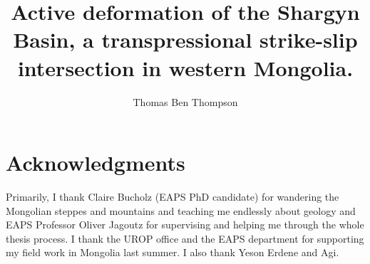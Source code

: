 \documentclass[12pt, doublepage, vi]{mitthesis}
\begin{document}
\title{Active deformation of the Shargyn Basin, a transpressional strike-slip intersection in western Mongolia.}
\author{Thomas Ben Thompson}
\maketitle


\section*{Acknowledgments}
Primarily, I thank Claire Bucholz (EAPS PhD candidate) for wandering the Mongolian steppes and mountains and teaching me endlessly about geology and EAPS Professor Oliver Jagoutz for supervising and helping me through the whole thesis process. I thank the UROP office and the EAPS department for supporting my field work in Mongolia last summer. I also thank Yeson Erdene and Agi.

\tableofcontents
\listoffigures
\clearpage





\appendix



\end{document}
